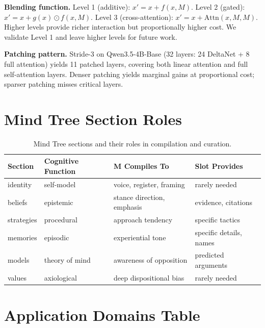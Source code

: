 \textbf{Blending function.} Level 1 (additive): $x' = x + f(x, M)$. Level 2 (gated): $x' = x + g(x) \odot f(x, M)$. Level 3 (cross-attention): $x' = x + \text{Attn}(x, M, M)$. Higher levels provide richer interaction but proportionally higher cost. We validate Level 1 and leave higher levels for future work.

\textbf{Patching pattern.} Stride-3 on Qwen3.5-4B-Base (32 layers: 24 DeltaNet + 8 full attention) yields 11 patched layers, covering both linear attention and full self-attention layers. Denser patching yields marginal gains at proportional cost; sparser patching misses critical layers.

\section{Mind Tree Section Roles}
\label{sec:mind_tree_roles_table}

\begin{table}[!ht]
\centering
\small
\caption{Mind Tree sections and their roles in compilation and curation.}
\label{tab:mind_tree}
\begin{tabular}{llll}
\toprule
\textbf{Section} & \textbf{Cognitive Function} & \textbf{M Compiles To} & \textbf{Slot Provides} \\
\midrule
identity & self-model & voice, register, framing & rarely needed \\
beliefs & epistemic & stance direction, emphasis & evidence, citations \\
strategies & procedural & approach tendency & specific tactics \\
memories & episodic & experiential tone & specific details, names \\
models & theory of mind & awareness of opposition & predicted arguments \\
values & axiological & deep dispositional bias & rarely needed \\
\bottomrule
\end{tabular}
\end{table}

\section{Application Domains Table}
\label{sec:application_domains_table}

